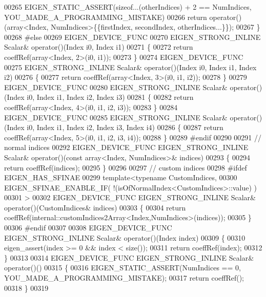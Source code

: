 \begin{DoxyCode}
00265       EIGEN\_STATIC\_ASSERT(\textcolor{keyword}{sizeof}...(otherIndices) + 2 == NumIndices, YOU\_MADE\_A\_PROGRAMMING\_MISTAKE)
00266       \textcolor{keywordflow}{return} operator()(array<Index, NumIndices>\{\{firstIndex, secondIndex, otherIndices...\}\});
00267     \}
00268 \textcolor{preprocessor}{#else}
00269     EIGEN\_DEVICE\_FUNC
00270     EIGEN\_STRONG\_INLINE Scalar& operator()(Index i0, Index i1)
00271     \{
00272       \textcolor{keywordflow}{return} coeffRef(array<Index, 2>(i0, i1));
00273     \}
00274     EIGEN\_DEVICE\_FUNC
00275     EIGEN\_STRONG\_INLINE Scalar& operator()(Index i0, Index i1, Index i2)
00276     \{
00277       \textcolor{keywordflow}{return} coeffRef(array<Index, 3>(i0, i1, i2));
00278     \}
00279     EIGEN\_DEVICE\_FUNC
00280     EIGEN\_STRONG\_INLINE Scalar& operator()(Index i0, Index i1, Index i2, Index i3)
00281     \{
00282       \textcolor{keywordflow}{return} coeffRef(array<Index, 4>(i0, i1, i2, i3));
00283     \}
00284     EIGEN\_DEVICE\_FUNC
00285     EIGEN\_STRONG\_INLINE Scalar& operator()(Index i0, Index i1, Index i2, Index i3, Index i4)
00286     \{
00287       \textcolor{keywordflow}{return} coeffRef(array<Index, 5>(i0, i1, i2, i3, i4));
00288     \}
00289 \textcolor{preprocessor}{#endif}
00290 
00291     \textcolor{comment}{// normal indices}
00292     EIGEN\_DEVICE\_FUNC EIGEN\_STRONG\_INLINE Scalar& operator()(\textcolor{keyword}{const} array<Index, NumIndices>& indices)
00293     \{
00294       \textcolor{keywordflow}{return} coeffRef(indices);
00295     \}
00296 
00297     \textcolor{comment}{// custom indices}
00298 \textcolor{preprocessor}{#ifdef EIGEN\_HAS\_SFINAE}
00299     \textcolor{keyword}{template}<\textcolor{keyword}{typename} CustomIndices,
00300              EIGEN\_SFINAE\_ENABLE\_IF( !(isOfNormalIndex<CustomIndices>::value) )
00301     >
00302     EIGEN\_DEVICE\_FUNC EIGEN\_STRONG\_INLINE Scalar& operator()(CustomIndices& indices)
00303     \{
00304       \textcolor{keywordflow}{return} coeffRef(internal::customIndices2Array<Index,NumIndices>(indices));
00305     \}
00306 \textcolor{preprocessor}{#endif}
00307 
00308     EIGEN\_DEVICE\_FUNC EIGEN\_STRONG\_INLINE Scalar& operator()(Index index)
00309     \{
00310       eigen\_assert(index >= 0 && index < size());
00311       \textcolor{keywordflow}{return} coeffRef(index);
00312     \}
00313 
00314     EIGEN\_DEVICE\_FUNC EIGEN\_STRONG\_INLINE Scalar& operator()()
00315     \{
00316       EIGEN\_STATIC\_ASSERT(NumIndices == 0, YOU\_MADE\_A\_PROGRAMMING\_MISTAKE);
00317       \textcolor{keywordflow}{return} coeffRef();
00318     \}
00319 

\end{DoxyCode}
